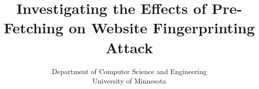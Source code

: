 \documentclass{sig-alternate-05-2015}
\begin{document}


%
%
%

%

\title{Investigating the Effects of Pre-Fetching on Website Fingerprinting Attack}
\subtitle{Department of Computer Science and  Engineering\\University of Minnesota}
%
%
%
%
%
\end{document}
